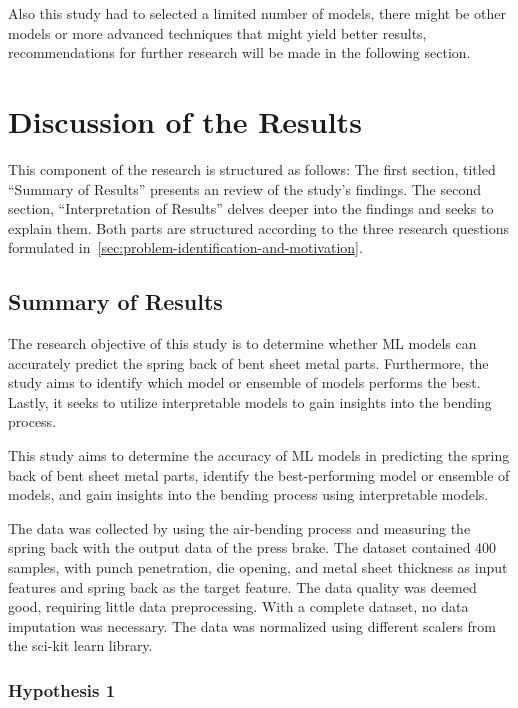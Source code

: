 Also this study had to selected a limited number of models,
there might be other models or more advanced techniques that might yield better results, recommendations for further
research will be made in the following section.


\section{Discussion of the Results}\label{sec:results-and-discussion}
This component of the research is structured as follows:
The first section, titled ``Summary of Results'' presents an review of the study's findings.
The second section, ``Interpretation of Results'' delves deeper into the findings and seeks to explain them.
Both parts are structured according to the three research questions formulated
in~\cref{sec:problem-identification-and-motivation}.

\subsection{Summary of Results}\label{subsec:summary-of-results}
The research objective of this study is to determine whether \ac{ML} models can accurately predict the spring back of
bent sheet metal parts.
Furthermore, the study aims to identify which model or ensemble of models performs the best.
Lastly, it seeks to utilize interpretable models to gain insights into the bending process.


This study aims to determine the accuracy of \ac{ML} models in predicting the spring back of bent sheet metal parts,
identify the best-performing model or ensemble of models, and gain insights into the bending process using
interpretable models.

The data was collected by using the air-bending process and measuring the spring back with the output data of the
press brake.
The dataset contained 400 samples, with punch penetration, die opening, and metal sheet thickness as
input features and spring back as the target feature.
The data quality was deemed good, requiring little data preprocessing.
With a complete dataset, no data imputation was necessary.
The data was normalized using different scalers from the sci-kit learn library.


\subsubsection{Hypothesis 1}

